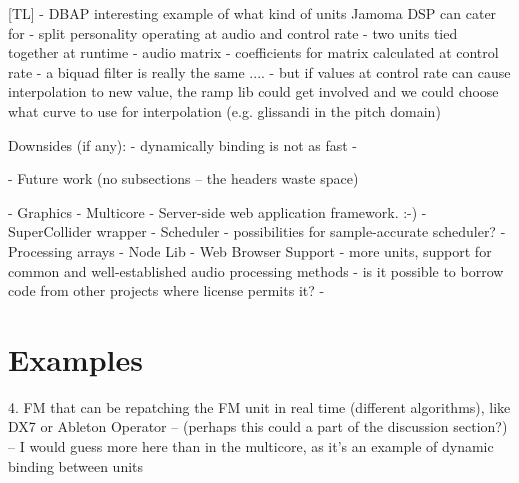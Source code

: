 \documentclass[twoside,10pt]{article}
\begin{document}
[TL]    - DBAP interesting example of what kind of units Jamoma DSP can cater for
        - split personality operating at audio and control rate
            - two units tied together at runtime
                - audio matrix
                - coefficients for matrix calculated at control rate
        - a biquad filter is really the same ....
            - but if values at control rate can cause interpolation to new value, the ramp lib could get involved and we could choose what curve to use for interpolation (e.g. glissandi in the pitch domain)


    Downsides (if any):
        -  dynamically binding is not as fast
        - 
    
- Future work (no subsections -- the headers waste space)

    - Graphics
    - Multicore
    - Server-side web application framework. :-)
    - SuperCollider wrapper
    - Scheduler - possibilities for sample-accurate scheduler?
    - Processing arrays
    - Node Lib
    - Web Browser Support
    - more units, support for common and well-established audio processing methods -  is it possible to borrow code from other projects where license permits it?
    - 
    

    
    





\section{Examples} %

4. FM that can be repatching the FM unit in real time (different algorithms), like DX7 or Ableton Operator  -- (perhaps this could a part of the discussion section?) -- I would guess more here than in the multicore, as it's an example of dynamic binding between units





\end{document}
